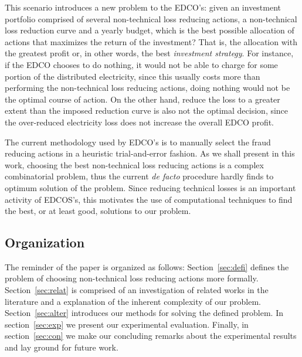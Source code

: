 This scenario introduces a new problem to the EDCO's: given an investment portfolio comprised of 
several non-technical loss reducing actions, a non-technical loss reduction curve and a yearly budget, which is the best possible 
allocation of actions that maximizes the return of the investment? That is, the 
allocation with the greatest profit or, in other words, the best \textit{investment strategy}.
For instance, if the EDCO chooses to do nothing, it would not be able to charge for some portion of the
distributed electricity,
since this usually costs more than performing the non-technical loss reducing actions, doing nothing would not
be the optimal course of action. On the other hand, reduce the loss to a greater extent than the
imposed reduction curve is also not the optimal decision, since the over-reduced electricity loss does not
increase the overall EDCO profit.

The current methodology used by EDCO's is to manually select the fraud reducing actions in
a heuristic trial-and-error fashion. As we shall present in this work, choosing the best non-technical loss reducing actions is
a complex combinatorial problem, thus the current \textit{de facto} procedure hardly finds to optimum solution of the problem.
Since reducing technical losses is an important activity of EDCOS's, this motivates the use of computational techniques to 
find the best, or at least good, solutions to our problem.


\subsection{Organization}
The reminder of the paper is organized as follows: Section~\ref{sec:defi} defines the
problem of choosing non-technical loss reducing actions more formally.
Section~\ref{sec:relat} is comprised of an investigation of related works in the literature 
and a explanation of the inherent complexity of our problem.
Section~\ref{sec:alter} introduces our methods for solving the defined problem. 
In section~\ref{sec:exp} we present our experimental evaluation. Finally, in section~\ref{sec:con} 
we make our concluding remarks about the experimental results and lay ground 
for future work.

                 
